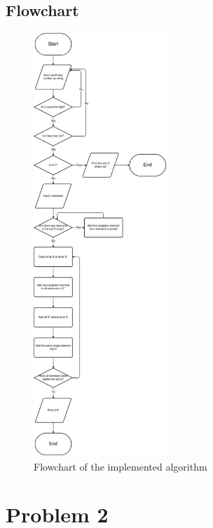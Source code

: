 \documentclass[a4paper]{article}
\theoremstyle{plain}
\theoremstyle{definition}
\theoremstyle{remark}
\begin{document}
\subsection{Flowchart}
\begin{figure}[H]
	\centering
	\includegraphics[width=0.45\textwidth]{figures/cs.png}
	\caption{Flowchart of the implemented algorithm}
	\label{fig:algorithm}
\end{figure}
\newpage
\section{Problem 2}

\newpage


	
\end{document}
